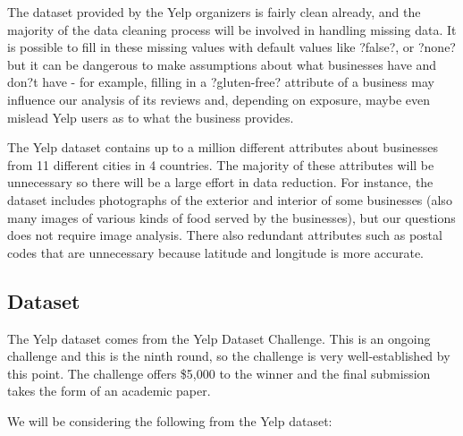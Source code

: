 \quad The dataset provided by the Yelp organizers is fairly clean already, and the majority of the data cleaning process will be involved in handling missing data. It is possible to fill in these missing values with default values like ?false?, or ?none? but it can be dangerous to make assumptions about what businesses have and don?t have - for example, filling in a ?gluten-free? attribute of a business may influence our analysis of its reviews and, depending on exposure, maybe even mislead Yelp users as to what the business provides.

\quad The Yelp dataset contains up to a million different attributes about businesses from 11 different cities in 4 countries. The majority of these attributes will be unnecessary so there will be a large effort in data reduction. For instance, the dataset includes photographs of the exterior and interior of some businesses (also many images of various kinds of food served by the businesses), but our questions does not require image analysis. There also redundant attributes such as postal codes that are unnecessary because latitude and longitude is more accurate.

\subsection{Dataset}

The Yelp dataset comes from the Yelp Dataset Challenge. This is an ongoing challenge and this is the ninth round, so the challenge is very well-established by this point. The challenge offers \$5,000 to the winner and the final submission takes the form of an academic paper.

\quad We will be considering the following from the Yelp dataset:


